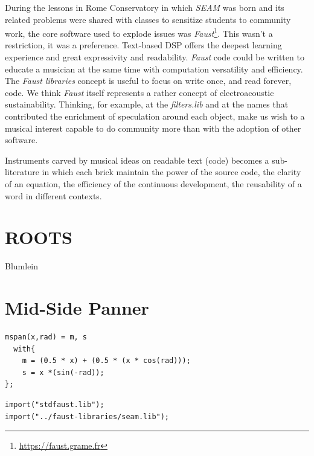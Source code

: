 \documentclass{article}
\begin{document}
During the lessons in Rome Conservatory in which \emph{SEAM} was born and its
related problems were shared with classes to sensitize students to community
work, the core software used to explode issues was \emph{Faust}\footnote{
\url{https://faust.grame.fr}}. This wasn't a restriction, it was a preference.
Text-based DSP offers the deepest learning experience and great expressivity
and readability. \emph{Faust} code could be written to educate a musician at
the same time with computation versatility and efficiency. The \emph{Faust
libraries} concept is useful to focus on write once, and read forever, code.
We think \emph{Faust} itself represents a rather concept of electroacoustic sustainability. Thinking, for example, at the \emph{filters.lib} and at the
names that contributed the enrichment of speculation around each object, make
us wish to a musical interest capable to do community more than with the
adoption of other software.

Instruments carved by musical ideas on readable text (code) becomes a
sub-literature in which each brick maintain the power of the source code, the
clarity of an equation, the efficiency of the continuous development, the
reusability of a word in different contexts.

\section{ROOTS}
\label{sec:roots}

Blumlein

\section{Mid-Side Panner}
\label{sec:mspanner}

\begin{lstlisting}
mspan(x,rad) = m, s
  with{
    m = (0.5 * x) + (0.5 * (x * cos(rad)));
    s = x *(sin(-rad));
};
\end{lstlisting}

\begin{lstlisting}
import("stdfaust.lib");
import("../faust-libraries/seam.lib");
\end{lstlisting}
\end{document}
